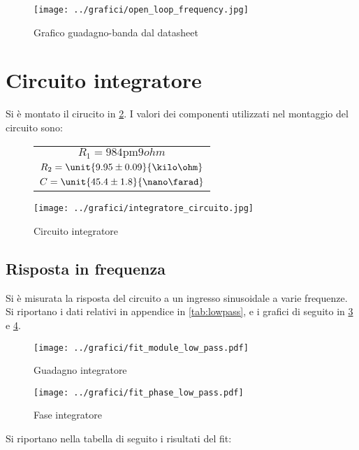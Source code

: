 \documentclass[10pt,a4paper]{article}
\begin{document}
\begin{figure}[h!]
	\centering
	\texttt{[image: ../grafici/open\_loop\_frequency.jpg]}
	\caption{Grafico guadagno-banda dal datasheet}
	\label{fig:open_loop_stocazzo}
\end{figure}

\section{Circuito integratore}

Si è montato il cirucito in \figurename{\ref{integratore}}. I valori dei componenti utilizzati nel montaggio del circuito sono:
\begin{figure}[H]
\begin{minipage}{0.49\textwidth}
\centering
\begin{tabular}{c}
$R_1 = \unit{984 \pm 9}{ohm}$	\\	$R_2 = \unit{9.95 \pm 0.09}{\kilo\ohm}$	\\	$C = \unit{45.4 \pm 1.8}{\nano\farad}$
\end{tabular}
\end{minipage}
\begin{minipage}{0.49\textwidth}
	\centering
	\texttt{[image: ../grafici/integratore\_circuito.jpg]}
	\caption{Circuito integratore}
	\label{integratore}
\end{minipage}
\end{figure}


\subsection{Risposta in frequenza}
Si è misurata la risposta del circuito a un ingresso sinusoidale a varie frequenze. Si riportano i dati relativi in appendice in \tablename{\ref{tab:lowpass}}, e i grafici di seguito in \figurename{\ref{fig:lowamp}} e \figurename{\ref{fig:lowph}}.
	\begin{figure}[H]
		\centering
		\texttt{[image: ../grafici/fit\_module\_low\_pass.pdf]}
		\caption{Guadagno integratore}
		\label{fig:lowamp}
	\end{figure}
	\begin{figure}[H]
		\centering
		\texttt{[image: ../grafici/fit\_phase\_low\_pass.pdf]}
		\caption{Fase integratore}
		\label{fig:lowph}
	\end{figure}

Si riportano nella tabella di seguito i risultati del fit:
\end{document}

